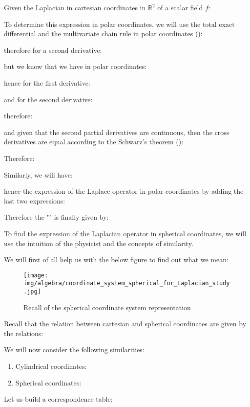	Given the Laplacian in cartesian coordinates in $\mathbb{R}^2$ of a scalar field $f$:
	
	To determine this expression in polar coordinates, we will use the total exact differential and the multivariate chain rule in polar coordinates ():
	
	therefore for a second derivative:
	
	but we know that we have in polar coordinates:
	
	hence for the first derivative:
	
	and for the second derivative:
	
	therefore:
	
	and given that the second partial derivatives are continuous, then the cross derivatives are equal according to the Schwarz's theorem ():
	
	Therefore:
	
	Similarly, we will have:
	
	hence the expression of the Laplace operator in polar coordinates by adding the last two expressions:
	
	Therefore the "" is finally given by:
	
	To find the expression of the Laplacian operator in spherical coordinates, we will use the intuition of the physicist and the concepts of similarity.
	
	We will first of all help us with the below figure to find out what we mean:
	\begin{figure}[H]
		\centering
		\texttt{[image: img/algebra/coordinate\_system\_spherical\_for\_Laplacian\_study.jpg]}
		\caption[]{Recall of the spherical coordinate system representation}
	\end{figure}
	Recall that the relation between cartesian and spherical coordinates are given by the relations:
	
	We will now consider the following similarities:
	\begin{enumerate}
		\item Cylindrical coordinates:
			
		
		\item Spherical coordinates:
			
	\end{enumerate}
	Let us build a correspondence table:
	
